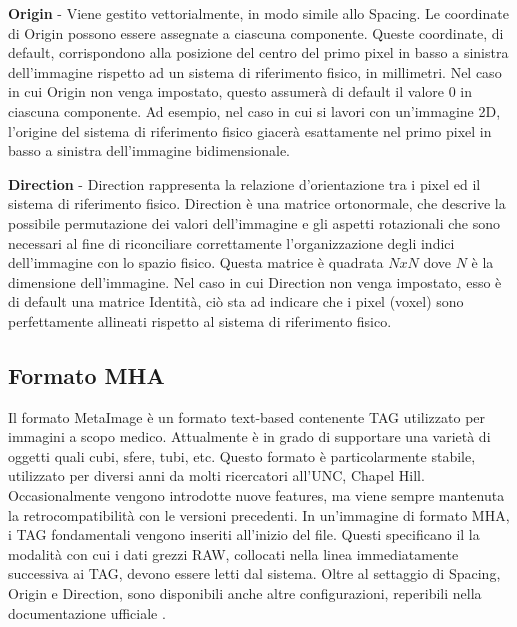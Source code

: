 \documentclass[a4paper,12pt, doubleside]{report}
\begin{document}
                \bigskip
                \textbf{Origin} - Viene gestito vettorialmente, in modo simile allo Spacing. Le coordinate di Origin possono essere assegnate a ciascuna componente. Queste coordinate, di default, corrispondono alla posizione del centro del primo pixel in basso a sinistra dell'immagine rispetto ad un sistema di riferimento fisico, in millimetri. Nel caso in cui Origin non venga impostato, questo assumerà di default il valore $0$ in ciascuna componente. Ad esempio, nel caso in cui si lavori con un'immagine 2D, l'origine del sistema di riferimento fisico giacerà esattamente nel primo pixel in basso a sinistra dell'immagine bidimensionale. 
                
                \bigskip
                \textbf{Direction} - Direction rappresenta la relazione d'orientazione tra i pixel ed il sistema di riferimento fisico. Direction è una matrice ortonormale, che descrive la possibile permutazione dei valori dell'immagine e gli aspetti rotazionali che sono necessari al fine di riconciliare correttamente l'organizzazione degli indici dell'immagine con lo spazio fisico. Questa matrice è quadrata $NxN$ dove $N$ è la dimensione dell'immagine. Nel caso in cui Direction non venga impostato, esso è di default una matrice Identità, ciò sta ad indicare che i pixel (voxel) sono perfettamente allineati rispetto al sistema di riferimento fisico.
                
            \subsection{Formato MHA}
                \par
                    Il formato MetaImage è un formato text-based contenente TAG utilizzato per immagini a scopo medico. Attualmente è in grado di supportare una varietà di oggetti quali cubi, sfere, tubi, etc. Questo formato è particolarmente stabile, utilizzato per diversi anni da molti ricercatori all'UNC, Chapel Hill. Occasionalmente vengono introdotte nuove features, ma viene sempre mantenuta la retrocompatibilità con le versioni precedenti. In un'immagine di formato MHA, i TAG fondamentali vengono inseriti all'inizio del file. Questi specificano il la modalità con cui i dati grezzi RAW, collocati nella linea immediatamente successiva ai TAG, devono essere letti dal sistema. Oltre al settaggio di Spacing, Origin e Direction, sono disponibili anche altre configurazioni, reperibili nella documentazione ufficiale \cite{mha-doc}. 
                    
\end{document}
